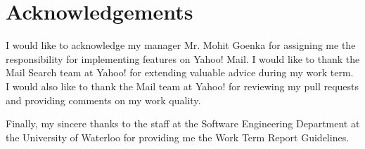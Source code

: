 \documentclass[12pt]{article}
\begin{document}
\newpage

\section{Acknowledgements}
I would like to acknowledge my manager Mr. Mohit Goenka for assigning me the responsibility for implementing features on Yahoo! Mail. I would like to thank the Mail Search team at Yahoo! for extending valuable advice during my work term. I would also like to thank the Mail team at Yahoo! for reviewing my pull requests and providing comments on my work quality.

Finally, my sincere thanks to the staff at the Software Engineering Department at the University of Waterloo for providing me the Work Term Report Guidelines.

\end{document}
